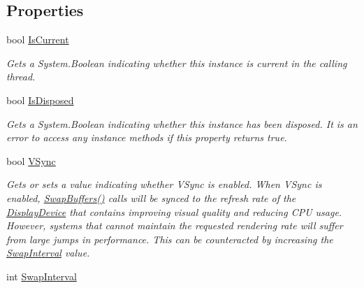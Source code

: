 \subsection*{Properties}
\begin{DoxyCompactItemize}
\item 
bool \hyperlink{interface_open_t_k_1_1_graphics_1_1_i_graphics_context_a1bf131a712f2a08f5f35e1542dccfb33}{Is\-Current}
\begin{DoxyCompactList}\small\item\em Gets a System.\-Boolean indicating whether this instance is current in the calling thread. \end{DoxyCompactList}\item 
bool \hyperlink{interface_open_t_k_1_1_graphics_1_1_i_graphics_context_af844efa5b99505bb659a892ec6200486}{Is\-Disposed}
\begin{DoxyCompactList}\small\item\em Gets a System.\-Boolean indicating whether this instance has been disposed. It is an error to access any instance methods if this property returns true. \end{DoxyCompactList}\item 
bool \hyperlink{interface_open_t_k_1_1_graphics_1_1_i_graphics_context_ad02e5a60e13f6ed668b8075ead268cb6}{V\-Sync}
\begin{DoxyCompactList}\small\item\em Gets or sets a value indicating whether V\-Sync is enabled. When V\-Sync is enabled, \hyperlink{interface_open_t_k_1_1_graphics_1_1_i_graphics_context_ad7d516da745576542161f1baa5f20129}{Swap\-Buffers()} calls will be synced to the refresh rate of the \hyperlink{class_open_t_k_1_1_display_device}{Display\-Device} that contains improving visual quality and reducing C\-P\-U usage. However, systems that cannot maintain the requested rendering rate will suffer from large jumps in performance. This can be counteracted by increasing the \hyperlink{interface_open_t_k_1_1_graphics_1_1_i_graphics_context_acdd6cc5339e7d0d428f4aa59b560940f}{Swap\-Interval} value. \end{DoxyCompactList}\item 
int \hyperlink{interface_open_t_k_1_1_graphics_1_1_i_graphics_context_acdd6cc5339e7d0d428f4aa59b560940f}{Swap\-Interval}

\end{DoxyCompactItemize}
